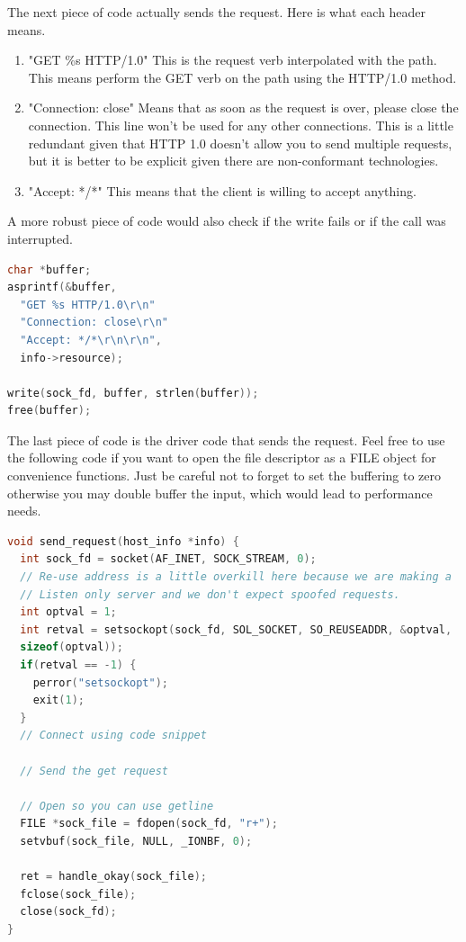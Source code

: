 The next piece of code actually sends the request. Here is what each header means.

\begin{enumerate}
  \item "GET \%s HTTP/1.0" This is the request verb interpolated with the path. This means perform the GET verb on the path using the HTTP/1.0 method.
  \item "Connection: close" Means that as soon as the request is over, please close the connection. This line won't be used for any other connections.
    This is a little redundant given that HTTP 1.0 doesn't allow you to send multiple requests, but it is better to be explicit given there are non-conformant technologies.
  \item "Accept: */*" This means that the client is willing to accept anything.
\end{enumerate}

A more robust piece of code would also check if the write fails or if the call was interrupted.

\begin{lstlisting}[language=C]
char *buffer;
asprintf(&buffer,
  "GET %s HTTP/1.0\r\n"
  "Connection: close\r\n"
  "Accept: */*\r\n\r\n",
  info->resource);

write(sock_fd, buffer, strlen(buffer));
free(buffer);
\end{lstlisting}

The last piece of code is the driver code that sends the request.
Feel free to use the following code if you want to open the file descriptor as a FILE object for convenience functions.
Just be careful not to forget to set the buffering to zero otherwise you may double buffer the input, which would lead to performance needs.

\begin{lstlisting}[language=C]
void send_request(host_info *info) {
  int sock_fd = socket(AF_INET, SOCK_STREAM, 0);
  // Re-use address is a little overkill here because we are making a
  // Listen only server and we don't expect spoofed requests.
  int optval = 1;
  int retval = setsockopt(sock_fd, SOL_SOCKET, SO_REUSEADDR, &optval,
  sizeof(optval));
  if(retval == -1) {
    perror("setsockopt");
    exit(1);
  }
  // Connect using code snippet

  // Send the get request

  // Open so you can use getline
  FILE *sock_file = fdopen(sock_fd, "r+");
  setvbuf(sock_file, NULL, _IONBF, 0);

  ret = handle_okay(sock_file);
  fclose(sock_file);
  close(sock_fd);
}
\end{lstlisting}

